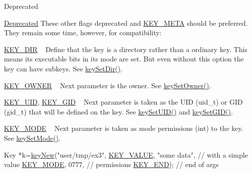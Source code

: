 \begin{DoxyRefDesc}{Deprecated}
\item[\hyperlink{deprecated__deprecated000008}{Deprecated}]These other flags deprecated and \hyperlink{group__key_gga91fb3178848bd682000958089abbaf40a040582834bb2d90049947d7ef74e87e2}{K\+E\+Y\+\_\+\+M\+E\+T\+A} should be preferred. They remain some time, however, for compatibility\+:
\begin{DoxyItemize}
\item \hyperlink{group__key_gga91fb3178848bd682000958089abbaf40a9e43e47c8a21478538e2d20e049981d5}{K\+E\+Y\+\_\+\+D\+I\+R} ~\newline
 Define that the key is a directory rather than a ordinary key. This means its executable bits in its mode are set. But even without this option the key can have subkeys. See \hyperlink{group__meta_gaae575bd86a628a15ee45baa860522e75}{key\+Set\+Dir()}.
\item \hyperlink{group__key_gga91fb3178848bd682000958089abbaf40a77ca60362fa8daca8d5347db4385068b}{K\+E\+Y\+\_\+\+O\+W\+N\+E\+R} ~\newline
 Next parameter is the owner. See \hyperlink{owner_8c_a88d6ec200ba0707b7c1b4a88133d2be4}{key\+Set\+Owner()}.
\item \hyperlink{group__key_gga91fb3178848bd682000958089abbaf40a28f01a87d65f065172f734c9c9446c0e}{K\+E\+Y\+\_\+\+U\+I\+D}, \hyperlink{group__key_gga91fb3178848bd682000958089abbaf40ac0628bbaba7c837ca73323681393d15f}{K\+E\+Y\+\_\+\+G\+I\+D} ~\newline
 Next parameter is taken as the U\+I\+D (uid\+\_\+t) or G\+I\+D (gid\+\_\+t) that will be defined on the key. See \hyperlink{group__meta_gab5f284f5ecd261e0a290095f50ba1af7}{key\+Set\+U\+I\+D()} and \hyperlink{group__meta_ga9e3d0fb3f7ba906e067727b9155d22e3}{key\+Set\+G\+I\+D()}.
\item \hyperlink{group__key_gga91fb3178848bd682000958089abbaf40a1b0a91ff3a855d6993930ebf0abaa518}{K\+E\+Y\+\_\+\+M\+O\+D\+E} ~\newline
 Next parameter is taken as mode permissions (int) to the key. See \hyperlink{group__meta_ga8803037e35b9da1ce492323a88ff6bc3}{key\+Set\+Mode()}. 
\begin{DoxyCodeInclude}
Key *k=\hyperlink{group__key_gad23c65b44bf48d773759e1f9a4d43b89}{keyNew}(\textcolor{stringliteral}{"user/tmp/ex3"},
        \hyperlink{group__key_gga91fb3178848bd682000958089abbaf40ac66e4a49d09212b79f5754ca6db5bd2e}{KEY\_VALUE}, \textcolor{stringliteral}{"some data"},    \textcolor{comment}{// with a simple value}
        \hyperlink{group__key_gga91fb3178848bd682000958089abbaf40a1b0a91ff3a855d6993930ebf0abaa518}{KEY\_MODE}, 0777,            \textcolor{comment}{// permissions}
        \hyperlink{group__key_gga91fb3178848bd682000958089abbaf40aa8adb6fcb92dec58fb19410eacfdd403}{KEY\_END});                  \textcolor{comment}{// end of args}
\end{DoxyCodeInclude}


\end{DoxyItemize}
\end{DoxyRefDesc}
